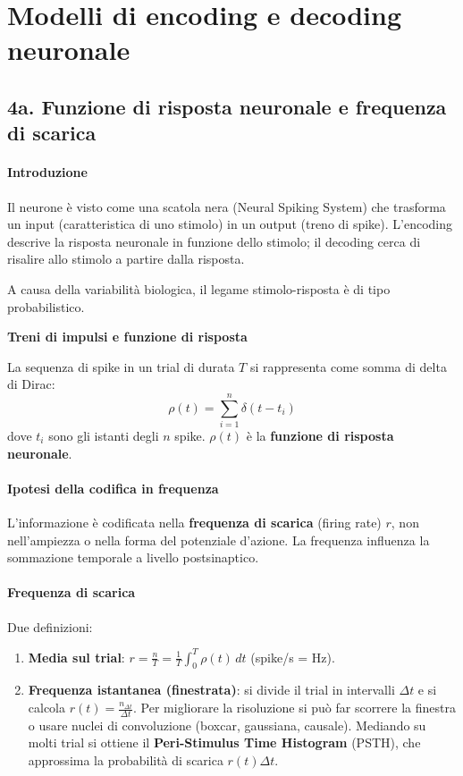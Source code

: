 \documentclass[12pt,a4paper,openany]{book}
\begin{document}
\chapter{Modelli di encoding e decoding neuronale}

\section{4a. Funzione di risposta neuronale e frequenza di scarica}

\subsubsection{Introduzione}

Il neurone è visto come una scatola nera (Neural Spiking System) che trasforma un input (caratteristica di uno stimolo) in un output (treno di spike). L'encoding descrive la risposta neuronale in funzione dello stimolo; il decoding cerca di risalire allo stimolo a partire dalla risposta.

A causa della variabilità biologica, il legame stimolo-risposta è di tipo probabilistico.

\textbf{Treni di impulsi e funzione di risposta}

La sequenza di spike in un trial di durata $T$ si rappresenta come somma di delta di Dirac:
\[
\rho(t) = \sum_{i=1}^{n} \delta(t - t_i)
\]
dove $t_i$ sono gli istanti degli $n$ spike. $\rho(t)$ è la \textbf{funzione di risposta neuronale}.

\subsubsection{Ipotesi della codifica in frequenza}

L'informazione è codificata nella \textbf{frequenza di scarica} (firing rate) $r$, non nell'ampiezza o nella forma del potenziale d'azione. La frequenza influenza la sommazione temporale a livello postsinaptico.

\subsubsection{Frequenza di scarica}

Due definizioni:
\begin{enumerate}
  \item \textbf{Media sul trial}: $r = \frac{n}{T} = \frac{1}{T}\int_0^T \rho(t)\,dt$ (spike/s = Hz).
  \item \textbf{Frequenza istantanea (finestrata)}: si divide il trial in intervalli $\Delta t$ e si calcola $r(t) = \frac{n_{\Delta t}}{\Delta t}$. Per migliorare la risoluzione si può far scorrere la finestra o usare nuclei di convoluzione (boxcar, gaussiana, causale). Mediando su molti trial si ottiene il \textbf{Peri-Stimulus Time Histogram} (PSTH), che approssima la probabilità di scarica $r(t)\Delta t$.
\end{enumerate}
\end{document}
